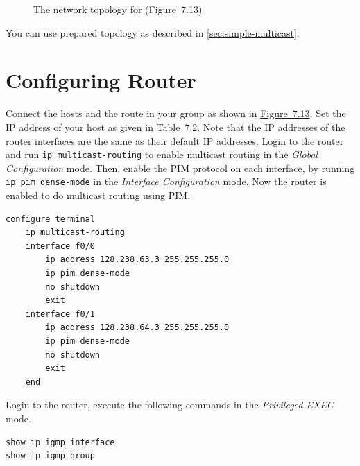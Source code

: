 \documentclass{../UTNetLab}
\begin{document}
    \begin{figure}[H]
        \centering
        \caption{The network topology for  (Figure~7.13)}
        \label{fig:7.13}
    \end{figure}

    You can use prepared topology as described in \autoref{sec:simple-multicast}.

\section{Configuring Router}
\label{sec:config-router}
    Connect the hosts and the route in your group as shown in \hyperref[fig:7.13]{Figure~7.13}. Set the IP address of your host as given in \hyperref[tab:7.2]{Table~7.2}. Note that the IP addresses of the router interfaces are the same as their default IP addresses.
    Login to the router and run \lstinline{ip multicast-routing} to enable multicast routing in the \textit{Global Configuration} mode.
    Then, enable the PIM protocol on each interface, by running \lstinline{ip pim dense-mode} in the \textit{Interface Configuration} mode. Now the router is enabled to do multicast routing using PIM.

    \begin{lstlisting}[language=cisco]
configure terminal
    ip multicast-routing
    interface f0/0
        ip address 128.238.63.3 255.255.255.0
        ip pim dense-mode
        no shutdown
        exit
    interface f0/1
        ip address 128.238.64.3 255.255.255.0
        ip pim dense-mode
        no shutdown
        exit
    end
    \end{lstlisting}

    Login to the router, execute the following commands in the \textit{Privileged EXEC} mode.
    \begin{lstlisting}[language=cisco]
show ip igmp interface
show ip igmp group
    \end{lstlisting}
\end{document}
